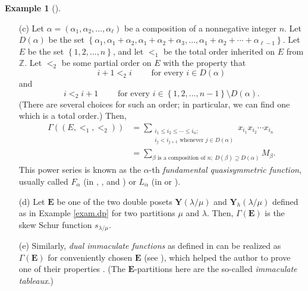 \documentclass[numbers=enddot,12pt,final,onecolumn,notitlepage,abstracton]{scrartcl}%
\theoremstyle{definition}
\newtheorem{exam}[theo]{Example}
\newenvironment{example}[1][]
{\begin{exam}[#1]\begin{leftbar}}
{\end{leftbar}\end{exam}}
\let\sumnonlimits\sum
\renewcommand{\sum}{\sumnonlimits\limits}
\newcommand{\EE}{{\mathbf{E}}}
\newcommand{\ZZ}{{\mathbb{Z}}}
\begin{document}
\begin{example}
\begin{enumerate}
\item[(c)] Let
$\alpha = \left(\alpha_1, \alpha_2, \ldots, \alpha_\ell\right)$
be a composition of a nonnegative integer $n$. Let
$D\left(\alpha\right)$ be the set
$\left\{\alpha_1, \alpha_1 + \alpha_2, \alpha_1 + \alpha_2
+ \alpha_3, \ldots, \alpha_1 + \alpha_2 + \cdots + \alpha_{\ell-1}
\right\}$.
Let $E$ be the set $\left\{1, 2, \ldots, n\right\}$, and let
$<_1$ be the total order inherited on $E$ from $\ZZ$. Let $<_2$ be some
partial order on $E$ with the property that
\[
i+1 <_2 i \qquad \text{ for every } i \in D\left(\alpha\right)
\]
and
\[
i <_2 i+1 \qquad \text{ for every }
i \in \left\{1, 2, \ldots, n-1\right\}
\setminus D\left(\alpha\right) .
\]
(There are several choices for such an order; in particular, we
can find one which is a total order.) Then,
\begin{align*}
\Gamma\left(\left(E, <_1, <_2\right)\right)
&= \sum_{\substack{i_1 \leq i_2 \leq \cdots \leq i_n; \\
                  i_j < i_{j+1} \text{ whenever } j \in D\left(\alpha\right)}}
  x_{i_1} x_{i_2} \cdots x_{i_n} \\
&= \sum_{\beta\text{ is a composition of }n;
        \ D\left(\beta\right) \supseteq D\left(\alpha\right)}
  M_\beta .
\end{align*}
This power series is known as the $\alpha$-th
\textit{fundamental quasisymmetric function}, usually called
$F_\alpha$ (in \cite{Gessel}, \cite[\S 2]{Mal-Reu-dua},
\cite[\S 2.4]{BBSSZ} and \cite[\S 2]{Gri-dimm})
or $L_\alpha$ (in \cite[\S 7.19]{Stanley-EC2} or
\cite[Definition 5.15]{Reiner}).

\item[(d)] Let $\EE$ be one of the two double posets
$\mathbf{Y}\left(\lambda / \mu\right)$ and
$\mathbf{Y}_h\left(\lambda / \mu\right)$
defined as in Example \ref{exam.dp} for two partitions $\mu$
and $\lambda$. Then, $\Gamma\left(\EE\right)$ is the skew
Schur function $s_{\lambda / \mu}$.

\item[(e)] Similarly, \textit{dual immaculate functions} as defined in
\cite[\S 3.7]{BBSSZ} can be realized as $\Gamma\left(\EE\right)$
for conveniently chosen $\EE$ (see \cite[Proposition 4.4]{Gri-dimm}), which
helped the author to prove one of their properties \cite{Gri-dimm}.
(The $\EE$-partitions here are the so-called
\textit{immaculate tableaux}.)


\end{enumerate}
\end{example}
\end{document}
